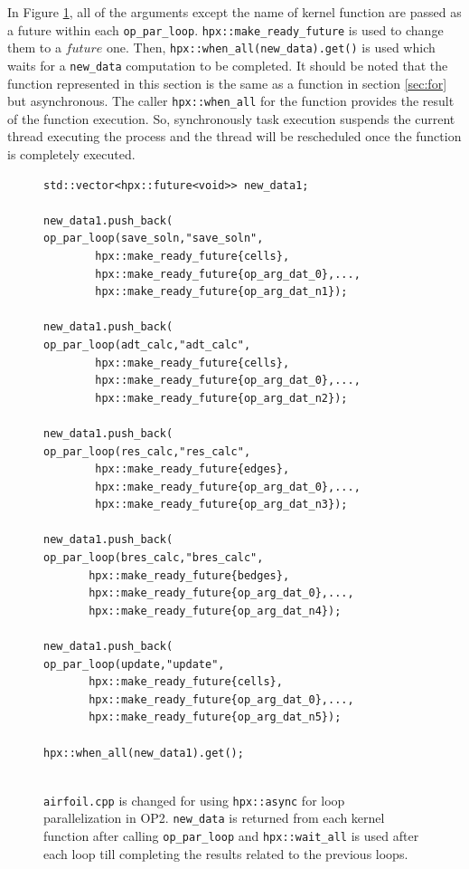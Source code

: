 \documentclass[conference]{IEEEtran}
\begin{document}
In  Figure \ref{l4}, all of the arguments except the name of kernel function are passed as a future within each \texttt{op\_par\_loop}. \texttt{hpx::make\_ready\_future} is used to change them to a $future$ one. Then, \texttt{hpx::when\_all(new\_data).get()} is used which waits for a \texttt{new\_data} computation to be completed. It should be noted that the function represented in this section is the same as a function in section \ref{sec:for} but asynchronous. The caller \texttt{hpx::when\_all} for the function provides the result of the function execution. So, synchronously task execution suspends the current thread executing the process and the thread will be rescheduled once the function is completely executed. 



\begin{figure}
    \begin{lstlisting}   
std::vector<hpx::future<void>> new_data1;

new_data1.push_back(
op_par_loop(save_soln,"save_soln", 
        hpx::make_ready_future{cells},
        hpx::make_ready_future{op_arg_dat_0},...,
        hpx::make_ready_future{op_arg_dat_n1});
  
new_data1.push_back(
op_par_loop(adt_calc,"adt_calc",
        hpx::make_ready_future{cells},
        hpx::make_ready_future{op_arg_dat_0},...,
        hpx::make_ready_future{op_arg_dat_n2});
   
new_data1.push_back(
op_par_loop(res_calc,"res_calc",
        hpx::make_ready_future{edges},
        hpx::make_ready_future{op_arg_dat_0},...,
        hpx::make_ready_future{op_arg_dat_n3});
 
new_data1.push_back(
op_par_loop(bres_calc,"bres_calc",
       hpx::make_ready_future{bedges},
       hpx::make_ready_future{op_arg_dat_0},...,
       hpx::make_ready_future{op_arg_dat_n4});
   
new_data1.push_back(
op_par_loop(update,"update",
       hpx::make_ready_future{cells},
       hpx::make_ready_future{op_arg_dat_0},...,
       hpx::make_ready_future{op_arg_dat_n5});
  
hpx::when_all(new_data1).get();
   
    \end{lstlisting}
    \caption{\small{\texttt{airfoil.cpp} is changed for using \texttt{hpx::async} for loop parallelization in OP2. \texttt{new\_data} is returned from each kernel function after calling \texttt{op\_par\_loop} and \texttt{hpx::wait\_all} is used after each loop till completing the results related to the previous loops.}}
    \label{l4}
\end{figure}
\end{document}

